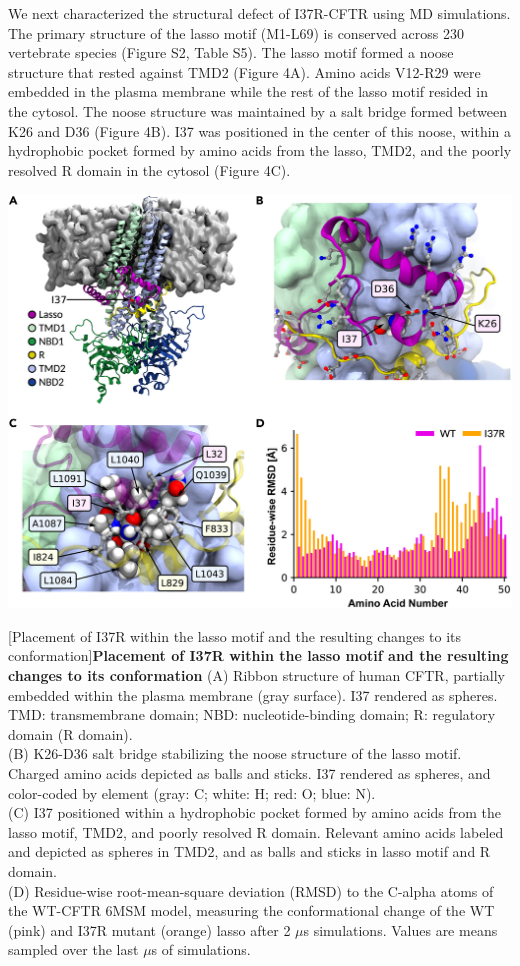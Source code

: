 We next characterized the structural defect of I37R-CFTR using MD simulations. The primary structure of the lasso motif (M1-L69) is conserved across 230 vertebrate species (Figure S2, Table S5). The lasso motif formed a noose structure that rested against TMD2 (Figure 4A). Amino acids V12-R29 were embedded in the plasma membrane while the rest of the lasso motif resided in the cytosol. The noose structure was maintained by a salt bridge formed between K26 and D36 (Figure 4B). I37 was positioned in the center of this noose, within a hydrophobic pocket formed by amino acids from the lasso, TMD2, and the poorly resolved R domain in the cytosol (Figure 4C).

\begin{center}
\includegraphics[width=\textwidth]{figures/I37R/MD_cftr.jpg}
\label{I37R_figure3}
\end{center}
\begingroup
{}[Placement of I37R within the lasso motif and the resulting changes to its conformation]{\textbf{Placement of I37R within the lasso motif and the resulting changes to its conformation}}{
	(A) Ribbon structure of human CFTR, partially embedded within the plasma membrane (gray surface). I37 rendered as spheres. TMD: transmembrane domain; NBD: nucleotide-binding domain; R: regulatory domain (R domain).\\

	(B) K26-D36 salt bridge stabilizing the noose structure of the lasso motif. Charged amino acids depicted as balls and sticks. I37 rendered as spheres, and color-coded by element (gray: C; white: H; red: O; blue: N).\\

	(C) I37 positioned within a hydrophobic pocket formed by amino acids from the lasso motif, TMD2, and poorly resolved R domain. Relevant amino acids labeled and depicted as spheres in TMD2, and as balls and sticks in lasso motif and R domain.\\

	(D) Residue-wise root-mean-square deviation (RMSD) to the C-alpha atoms of the WT-CFTR 6MSM model, measuring the conformational change of the WT (pink) and I37R mutant (orange) lasso after 2 $\mu$s simulations. Values are means sampled over the last $\mu$s of simulations.\\
}
